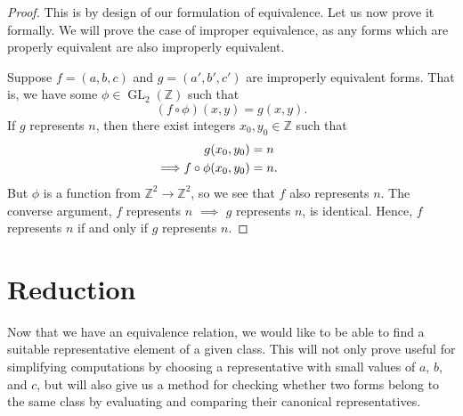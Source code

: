 \documentclass[honours,12pt]{unswthesis}
\newcommand{\Z}{\mathbb{Z}} %
\DeclareMathOperator{\GL}{GL}
\numberwithin{equation}{section}
\begin{document}
\begin{proof}
    This is by design of our formulation of equivalence.
    Let us now prove it formally.
    We will prove the case of improper equivalence, as any forms which are properly equivalent are also improperly equivalent.

    Suppose $f = (a, b, c)$ and $g = (a', b', c')$ are improperly equivalent forms.
    That is, we have some $\phi \in \GL_2(\Z)$ such that
    $$(f \circ \phi)(x, y) = g(x, y).$$
    If $g$ represents $n$, then there exist integers $x_0, y_0 \in \Z$ such that
    \begin{align*}
        g(x_0, y_0) &= n \\
        \llap{$\implies$} f \circ \phi(x_0, y_0) &= n.
    \end{align*}
    But $\phi$ is a function from $\Z^2 \rightarrow \Z^2$, so we see that $f$ also represents $n$.
    The converse argument, $f$ represents $n$ $\implies$ $g$ represents $n$, is identical.
    Hence, $f$ represents $n$ if and only if $g$ represents $n$.
\end{proof}



\section{Reduction}\label{s-forms-red}
Now that we have an equivalence relation, we would like to be able to find a suitable representative element of a given class.
This will not only prove useful for simplifying computations by choosing a representative with small values of $a$, $b$, and $c$,
but will also give us a method for checking whether two forms belong to the same class by evaluating and comparing their canonical representatives.
\end{document}
